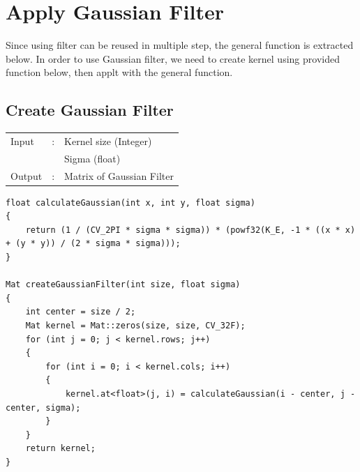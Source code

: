 \documentclass[12pt,a4paper]{report}
\begin{document}
\section{Apply Gaussian Filter}
Since using filter can be reused in multiple step, the general function is extracted below.
In order to use Gaussian filter, we need to create kernel using provided function below, then applt with the general function.
\subsection{Create Gaussian Filter}
\begin{tabular}{lll}
    Input  & : & Kernel size (Integer)     \\
           &   & Sigma (float)             \\
    Output & : & Matrix of Gaussian Filter \\
\end{tabular}
\begin{lstlisting}
float calculateGaussian(int x, int y, float sigma)
{
    return (1 / (CV_2PI * sigma * sigma)) * (powf32(K_E, -1 * ((x * x) + (y * y)) / (2 * sigma * sigma)));
}

Mat createGaussianFilter(int size, float sigma)
{
    int center = size / 2;
    Mat kernel = Mat::zeros(size, size, CV_32F);
    for (int j = 0; j < kernel.rows; j++)
    {
        for (int i = 0; i < kernel.cols; i++)
        {
            kernel.at<float>(j, i) = calculateGaussian(i - center, j - center, sigma);
        }
    }
    return kernel;
}
\end{lstlisting}
\end{document}
